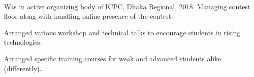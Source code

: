  \\

\vspace{\topsep} %
\begin{tightitemize}
\item Was in active organizing body of ICPC, Dhaka Regional, 2018. Managing contest floor along with handling online presence of the contest. 
\item Arranged various workshop and technical talks to encourage students in rising technologies.
\item Arranged specific training courses for weak and advanced students alike (differently). 
\end{tightitemize}

\sectionspace %